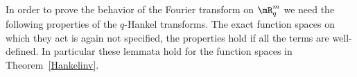 In order to prove the behavior of the Fourier transform on $\mR^m_q$ we need the following properties of the $q$-Hankel transforms. The exact function spaces on which they act is again not specif\/ied, the properties hold if all the terms are well-def\/ined. In particular these lemmata hold for the function spaces in Theorem~\ref{Hankelinv}.

